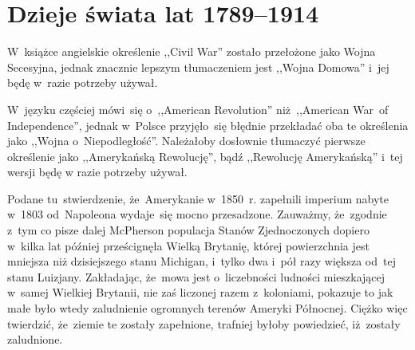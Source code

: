 \documentclass[a4paper,11pt]{article}
\begin{document}
\vspace{\spaceTwo}





\section{Dzieje świata lat 1789--1914}

\vspace{\spaceTwo}






\start W~książce angielskie określenie ,,Civil War'' zostało
przełożone jako Wojna Secesyjna, jednak znacznie lepszym tłumaczeniem
jest ,,Wojna Domowa'' i~jej będę w~razie potrzeby używał.

\vspace{\spaceFour}


\start W~języku częściej mówi~się o~,,American Revolution''
niż~,,American War~of Independence'', jednak w~Polsce przyjęło~się
błędnie przekładać oba te określenia jako ,,Wojna o~Niepodległość''.
Należałoby dosłownie tłumaczyć pierwsze określenie jako ,,Amerykańską
Rewolucję'', bądź ,,Rewolucję Amerykańską'' i~tej wersji będę w razie
potrzeby używał.

\vspace{\spaceFour}


\start {} Podane tu~stwierdzenie, że~Amerykanie w~1850~r.
zapełnili imperium nabyte w~1803 od~Napoleona wydaje~się mocno
przesadzone. Zauważmy, że~zgodnie z~tym co pisze dalej McPherson
populacja Stanów Zjednoczonych dopiero w~kilka lat później
prześcignęła Wielką Brytanię, której powierzchnia jest mniejsza niż
dzisiejszego stanu Michigan, i~tylko dwa i~pół razy większa od~tej
stanu Luizjany. Zakładając, że~mowa jest o~liczebności ludności
mieszkającej w~samej Wielkiej Brytanii, nie zaś liczonej razem
z~koloniami, pokazuje to jak małe było wtedy zaludnienie ogromnych
terenów Ameryki Północnej. Ciężko więc twierdzić, że~ziemie te zostały
zapełnione, trafniej byłoby powiedzieć, iż~zostały zaludnione.

\end{document}
